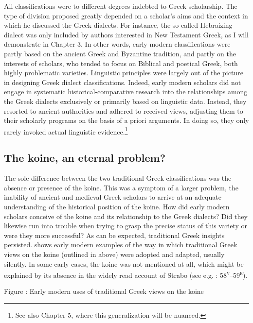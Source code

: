 All classifications were to different degrees indebted to Greek scholarship. The type of division proposed greatly depended on a scholar’s aims and the context in which he discussed the Greek dialects. For instance, the so-called Hebraizing dialect was only included by authors interested in New Testament Greek, as I will demonstrate in Chapter 3. In other words, early modern classifications were partly based on the ancient Greek and Byzantine tradition, and partly on the interests of scholars, who tended to focus on Biblical and poetical Greek, both highly problematic varieties. Linguistic principles were largely out of the picture in designing Greek dialect classifications. Indeed, early modern scholars did not engage in systematic historical-comparative research into the relationships among the Greek dialects exclusively or primarily based on linguistic data. Instead, they resorted to ancient authorities and adhered to received views, adjusting them to their scholarly programs on the basis of a priori arguments. In doing so, they only rarely invoked actual linguistic evidence.\footnote{See also Chapter 5, where this generalization will be nuanced.}

\subsection{The koine, an eternal problem?}
\hypertarget{Toc19704815}{}
The sole difference between the two traditional Greek classifications was the absence or presence of the koine. This was a symptom of a larger problem, the inability of ancient and medieval Greek scholars to arrive at an adequate understanding of the historical position of the koine. How did early modern scholars conceive of the koine and its relationship to the Greek dialects? Did they likewise run into trouble when trying to grasp the precise status of this variety or were they more successful? As can be expected, traditional Greek insights persisted.  shows early modern examples of the way in which traditional Greek views on the koine (outlined in  above) were adopted and adapted, usually silently. In some early cases, the koine was not mentioned at all, which might be explained by its absence in the widely read account of Strabo (see e.g. \citealt{Stapleton1566}: 58\textsc{\textsuperscript{v}}–59\textsc{\textsuperscript{r}}).

\begin{stylecaption}
Figure : Early modern uses of traditional Greek views on the koine
\end{stylecaption}


